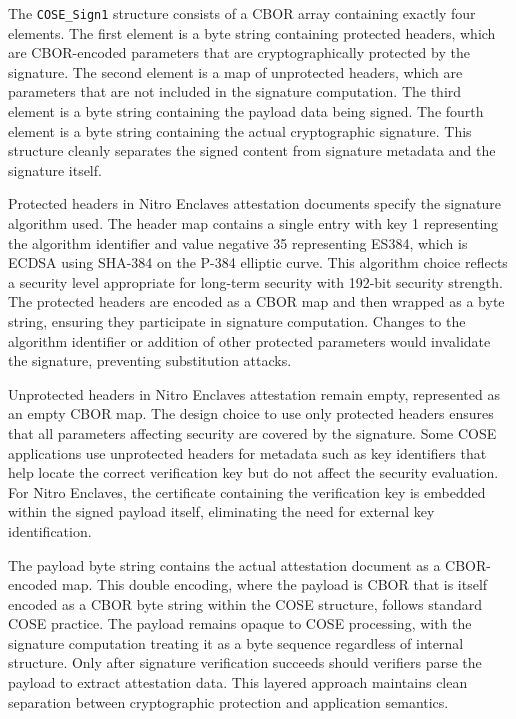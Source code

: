 The \texttt{COSE\_Sign1} structure consists of a CBOR array containing exactly four elements. The first element is a byte string containing protected headers, which are CBOR-encoded parameters that are cryptographically protected by the signature. The second element is a map of unprotected headers, which are parameters that are not included in the signature computation. The third element is a byte string containing the payload data being signed. The fourth element is a byte string containing the actual cryptographic signature. This structure cleanly separates the signed content from signature metadata and the signature itself.


Protected headers in Nitro Enclaves attestation documents specify the signature algorithm used. The header map contains a single entry with key 1 representing the algorithm identifier and value negative 35 representing ES384, which is ECDSA using SHA-384 on the P-384 elliptic curve. This algorithm choice reflects a security level appropriate for long-term security with 192-bit security strength. The protected headers are encoded as a CBOR map and then wrapped as a byte string, ensuring they participate in signature computation. Changes to the algorithm identifier or addition of other protected parameters would invalidate the signature, preventing substitution attacks.

Unprotected headers in Nitro Enclaves attestation remain empty, represented as an empty CBOR map. The design choice to use only protected headers ensures that all parameters affecting security are covered by the signature. Some COSE applications use unprotected headers for metadata such as key identifiers that help locate the correct verification key but do not affect the security evaluation. For Nitro Enclaves, the certificate containing the verification key is embedded within the signed payload itself, eliminating the need for external key identification.

The payload byte string contains the actual attestation document as a CBOR-encoded map. This double encoding, where the payload is CBOR that is itself encoded as a CBOR byte string within the COSE structure, follows standard COSE practice. The payload remains opaque to COSE processing, with the signature computation treating it as a byte sequence regardless of internal structure. Only after signature verification succeeds should verifiers parse the payload to extract attestation data. This layered approach maintains clean separation between cryptographic protection and application semantics.

